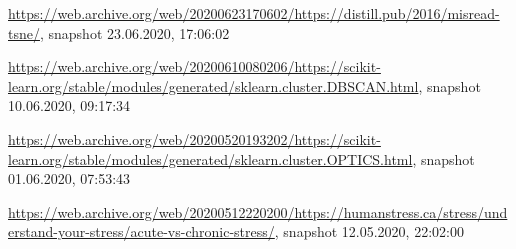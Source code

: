 \begin{appendices}
\url{https://web.archive.org/web/20200623170602/https://distill.pub/2016/misread-tsne/}, snapshot 23.06.2020, 17:06:02

\url{https://web.archive.org/web/20200610080206/https://scikit-learn.org/stable/modules/generated/sklearn.cluster.DBSCAN.html}, snapshot 10.06.2020, 09:17:34

\url{https://web.archive.org/web/20200520193202/https://scikit-learn.org/stable/modules/generated/sklearn.cluster.OPTICS.html}, snapshot 01.06.2020, 07:53:43

\url{https://web.archive.org/web/20200512220200/https://humanstress.ca/stress/understand-your-stress/acute-vs-chronic-stress/}, snapshot 12.05.2020, 22:02:00



\end{appendices}
